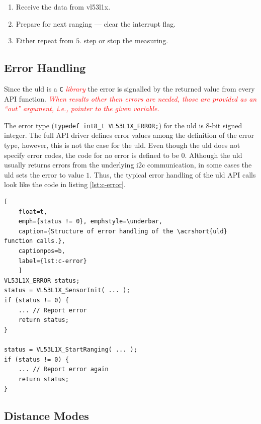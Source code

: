 \documentclass[
  digital,     %
  oneside,     %
  nosansbold,  %
  nocolorbold, %
  lof,         %
  lot,         %
]{fithesis4}
\newcommand{\TODO}[1]{\textcolor{red}{\textit{#1}}}
\begin{document}
{{{\begin{enumerate}
    \item Receive the data from \gls{vl53l1x}.
    
    \item Prepare for next ranging --- clear the interrupt flag.
    
    \item Either repeat from $5.$ step or stop the measuring.
\end{enumerate}


\subsection{ Error Handling }

Since the \acrshort{uld} is a \verb|C| \TODO{library} the error is signalled by the returned value from every API function. \TODO{When results other then errors are needed, those are provided as an ``out'' argument, i.e., pointer to the given variable.}

The error type (\lstinline[breaklines=false]|typedef int8_t VL53L1X_ERROR;|) for the \acrshort{uld} is 8-bit signed integer. The full API driver defines error values among the definition of the error type, however, this is not the case for the \acrshort{uld}. Even though the \acrshort{uld} does not specify error codes, the code for no error is defined to be $0$. Although the \acrshort{uld} usually returns errors from the underlying \acrshort{i2c} communication, in some cases the \acrshort{uld} sets the error to value $1$. Thus, the typical error handling of the \acrshort{uld} API calls look like the code in listing \ref{lst:c-error}.

\begin{lstlisting}[
    float=t,
    emph={status != 0}, emphstyle=\underbar,
    caption={Structure of error handling of the \acrshort{uld} function calls.},
    captionpos=b,
    label={lst:c-error}
    ]
VL53L1X_ERROR status;
status = VL53L1X_SensorInit( ... );
if (status != 0) {
    ... // Report error
    return status;
}

status = VL53L1X_StartRanging( ... );
if (status != 0) {
    ... // Report error again
    return status;
}
\end{lstlisting}

\subsection{ Distance Modes } \label{sec:distance-modes}

}}}
\end{document}
